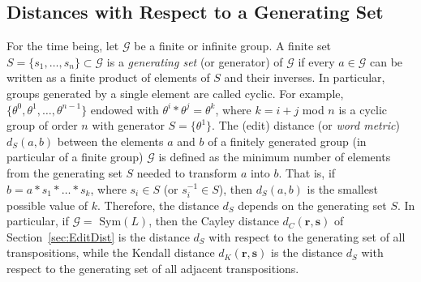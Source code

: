 \documentclass{article}
\begin{document}
\subsection{Distances with Respect to a Generating Set}

\label{sec:DistwithGenerators}

For the time being, let $\mathcal{G}$ be a finite or infinite group. A
finite set $S=\{s_{1},\ldots,s_{n}\}\subset \mathcal{G}$ is a \textit{%
generating set} (or generator) of $\mathcal{G}$ if every $a\in \mathcal{G}$
can be written as a finite product of elements of $S$ and their inverses. In
particular, groups generated by a single element are called cyclic. For
example, $\{\theta ^{0},\theta ^{1},\ldots,\theta ^{n-1}\}$ endowed with $%
\theta ^{i}\ast \theta ^{j}=\theta ^{k}$, where $k=i+j$ \textrm{mod} $n$ is
a cyclic group of order $n$ with generator $S=\{\theta ^{1}\}$. The (edit)
distance (or \textit{word metric}) $d_{S}(a,b)$ between the elements $a$ and 
$b$ of a finitely generated group (in particular of a finite group) $%
\mathcal{G}$ is defined as the minimum number of elements from the
generating set $S$ needed to transform $a$ into $b$. That is, if $b=a\ast
s_{1}\ast \ldots\ast s_{k}$, where $s_{i}\in S$ (or $s_{i}^{-1}\in S$), then $%
d_{S}(a,b)$ is the smallest possible value of $k$. Therefore, the distance $%
d_{S}$ depends on the generating set $S$. In particular, if $\mathcal{G}=$ $%
\mathrm{Sym}(L)$, then the Cayley distance $d_{C}(\mathbf{r},\mathbf{s})$ of
Section~\ref{sec:EditDist} is the distance $d_{S}$ with respect to the
generating set of all transpositions, while the Kendall distance $d_{K}(%
\mathbf{r},\mathbf{s})$ is the distance $d_{S}$ with respect to the
generating set of all adjacent transpositions.
\end{document}
